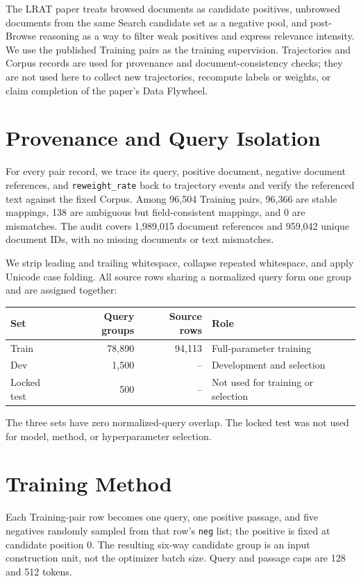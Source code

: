 \documentclass[10pt,a4paper]{article}
\begin{document}
The LRAT paper treats browsed documents as candidate positives, unbrowsed documents from the same Search candidate set as a negative pool, and post-Browse reasoning as a way to filter weak positives and express relevance intensity. We use the published Training pairs as the training supervision. Trajectories and Corpus records are used for provenance and document-consistency checks; they are not used here to collect new trajectories, recompute labels or weights, or claim completion of the paper's Data Flywheel.

\section{Provenance and Query Isolation}
For every pair record, we trace its query, positive document, negative document references, and \texttt{reweight\_rate} back to trajectory events and verify the referenced text against the fixed Corpus. Among 96,504 Training pairs, 96,366 are stable mappings, 138 are ambiguous but field-consistent mappings, and 0 are mismatches. The audit covers 1,989,015 document references and 959,042 unique document IDs, with no missing documents or text mismatches.

We strip leading and trailing whitespace, collapse repeated whitespace, and apply Unicode case folding. All source rows sharing a normalized query form one group and are assigned together:

\begin{center}
\small
\begin{tabular}{lrrl}
\toprule
Set & Query groups & Source rows & Role \\
\midrule
Train & 78,890 & 94,113 & Full-parameter training \\
Dev & 1,500 & -- & Development and selection \\
Locked test & 500 & -- & Not used for training or selection \\
\bottomrule
\end{tabular}
\end{center}

The three sets have zero normalized-query overlap. The locked test was not used for model, method, or hyperparameter selection.

\section{Training Method}
Each Training-pair row becomes one query, one positive passage, and five negatives randomly sampled from that row's \texttt{neg} list; the positive is fixed at candidate position 0. The resulting six-way candidate group is an input construction unit, not the optimizer batch size. Query and passage caps are 128 and 512 tokens.
\end{document}
